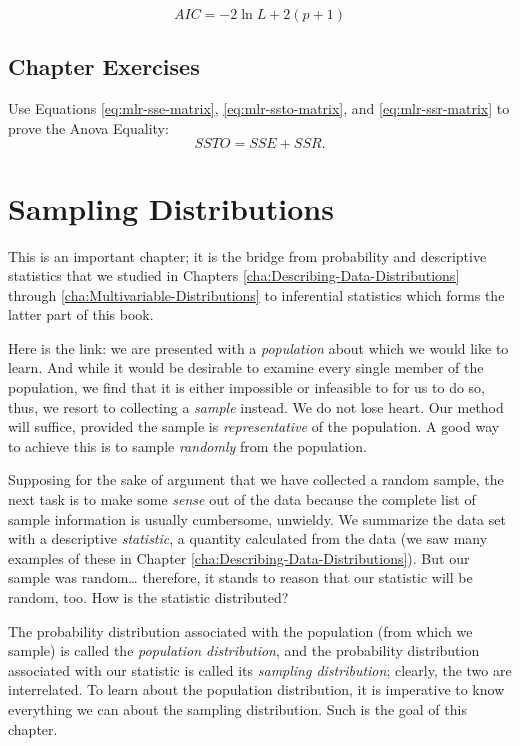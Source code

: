 \documentclass[captions=tableheading]{scrbook}
\begin{document}
\[
AIC=-2\ln L+2(p+1)
\]


\newpage{}
\section{Chapter Exercises}
\label{sec-7-10}


\setcounter{thm}{0}

\begin{xca}
\label{xca:anova-equality}
Use Equations \ref{eq:mlr-sse-matrix}, \ref{eq:mlr-ssto-matrix}, and \ref{eq:mlr-ssr-matrix} to prove the Anova Equality:
\[
SSTO=SSE+SSR.
\]
\end{xca}
\chapter{Sampling Distributions}
\label{sec-8}

\label{cha:Sampling-Distributions}

\noindent This is an important chapter; it is the bridge from probability and descriptive statistics that we studied in Chapters \ref{cha:Describing-Data-Distributions} through \ref{cha:Multivariable-Distributions} to inferential statistics which forms the latter part of this book.

Here is the link: we are presented with a \emph{population} about which we would like to learn. And while it would be desirable to examine every single member of the population, we find that it is either impossible or infeasible to for us to do so, thus, we resort to collecting a \emph{sample} instead. We do not lose heart. Our method will suffice, provided the sample is \emph{representative} of the population. A good way to achieve this is to sample \emph{randomly} from the population.

Supposing for the sake of argument that we have collected a random sample, the next task is to make some \emph{sense} out of the data because the complete list of sample information is usually cumbersome, unwieldy. We summarize the data set with a descriptive \emph{statistic}, a quantity calculated from the data (we saw many examples of these in Chapter \ref{cha:Describing-Data-Distributions}). But our sample was random\ldots{} therefore, it stands to reason that our statistic will be random, too. How is the statistic distributed?

The probability distribution associated with the population (from which we sample) is called the \emph{population distribution}, and the probability distribution associated with our statistic is called its \emph{sampling distribution}; clearly, the two are interrelated. To learn about the population distribution, it is imperative to know everything we can about the sampling distribution. Such is the goal of this chapter.
\end{document}
